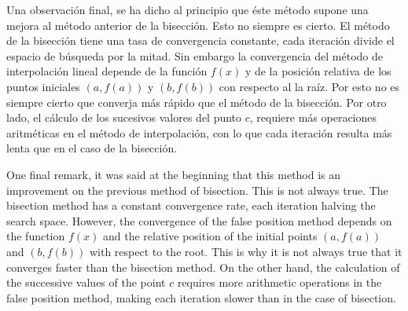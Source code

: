 \begin{paracol}{2}

Una observación final, se ha dicho al principio que éste método supone una mejora al método anterior de la bisección. Esto no siempre es cierto. El método de la bisección tiene una tasa de convergencia constante, cada iteración divide el espacio de búsqueda por la mitad. Sin embargo la convergencia del método de interpolación  lineal depende de la función $f(x)$ y de la posición relativa de los puntos iniciales $(a, f(a))$  y $(b, f(b))$ con respecto al la raíz. Por esto no es siempre cierto que converja más rápido que el método de  la bisección. Por otro lado, el cálculo de los sucesivos valores del punto $c$, requiere más operaciones aritméticas en el método de interpolación, con lo que cada iteración resulta más lenta que en el caso de la bisección.

\switchcolumn

One final remark, it was said at the beginning that this method is an improvement on the previous method of bisection. This is not always true. The bisection method has a constant convergence rate, each iteration halving the search space. However, the convergence of the false position method depends on the function $f(x)$ and the relative position of the initial points $(a, f(a))$ and $(b, f(b))$ with respect to the root. This is why it is not always true that it converges faster than the bisection method. On the other hand, the calculation of the successive values of the point $c$ requires more arithmetic operations in the false position method, making each iteration slower than in the case of bisection.

\end{paracol}

\begin{figure}
\centering
{} \qquad
{}\\
\qquad
{}\\

\label{fig:iterr2}
\end{figure}

